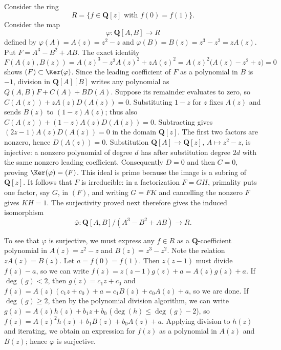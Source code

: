 \begin{example}
\label{editorial-source-example-affine-open-not-standard}
Consider the ring
$$
R = \{ f \in \mathbf{Q}[z]\text{ with }f(0) = f(1) \}.
$$
Consider the map
$$
\varphi : \mathbf{Q}[A, B] \to R
$$
defined by $\varphi(A)=A(z)=z^2-z$ and
$\varphi(B)=B(z)=z^3-z^2=zA(z)$.
Put $F=A^3-B^2+AB$. The exact identity
$$
F(A(z),B(z))=A(z)^3-z^2A(z)^2+zA(z)^2
=A(z)^2\bigl(A(z)-z^2+z\bigr)=0
$$
shows $(F)\subset\Ker(\varphi)$.
Since the leading coefficient of $F$ as a polynomial in $B$ is $-1$,
division in $\mathbf Q[A][B]$ writes any polynomial as
$Q(A,B)F+C(A)+BD(A)$.
Suppose its remainder evaluates to zero, so
$C(A(z))+zA(z)D(A(z))=0$.
Substituting $1-z$ for $z$ fixes $A(z)$ and sends $B(z)$ to
$(1-z)A(z)$; thus also $C(A(z))+(1-z)A(z)D(A(z))=0$.
Subtracting gives $(2z-1)A(z)D(A(z))=0$ in the domain $\mathbf Q[z]$.
The first two factors are nonzero, hence $D(A(z))=0$.
Substitution $\mathbf Q[A]\to\mathbf Q[z]$, $A\mapsto z^2-z$,
is injective: a nonzero polynomial of degree $d$ has after substitution
degree $2d$ with the same nonzero leading coefficient.
Consequently $D=0$ and then $C=0$, proving $\Ker(\varphi)=(F)$.
This ideal is prime because the image is a subring of $\mathbf Q[z]$.
It follows that $F$ is irreducible: in a factorization $F=GH$, primality
puts one factor, say $G$, in $(F)$, and writing $G=FK$ and cancelling
the nonzero $F$ gives $KH=1$.
The surjectivity proved next therefore gives the induced isomorphism
$$
\overline\varphi:\mathbf Q[A,B]/(A^3-B^2+AB)\longrightarrow R.
$$

\medskip\noindent
To see that $\varphi$ is surjective, we must express any
$f\in R$ as a $\mathbf{Q}$-coefficient polynomial in $A(z) = z^2-z$
and $B(z) = z^3-z^2$. Note the relation $zA(z) = B(z)$. Let
$a = f(0) = f(1)$. Then $z(z-1)$ must divide $f(z)-a$, so we can write
$f(z) = z(z-1)g(z)+a = A(z)g(z)+a$.  If $\deg(g) < 2$, then
$g(z) = c_1z + c_0$ and $f(z) = A(z)(c_1z + c_0)+a = c_1B(z)+c_0A(z)+a$, so we
are done.  If $\deg(g)\geq 2$, then by the polynomial division
algorithm, we can write $g(z) = A(z)h(z)+b_1z + b_0$
($\deg(h)\leq\deg(g)-2$), so $f(z) = A(z)^2h(z)+b_1B(z)+b_0A(z)+a$.
Applying division to $h(z)$ and iterating, we obtain an expression
for $f(z)$ as a polynomial in $A(z)$ and $B(z)$; hence $\varphi$ is
surjective.


\end{example}
